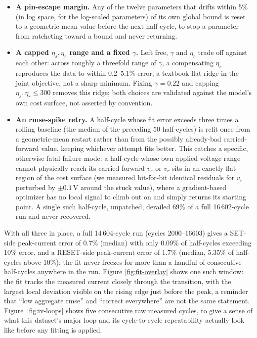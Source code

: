 \documentclass[11pt]{article}
\begin{document}
\begin{itemize}
\item \textbf{A pin-escape margin.} Any of the twelve parameters that drifts
  within 5\% (in log space, for the log-scaled parameters) of its own global
  bound is reset to a geometric-mean value before the next half-cycle, to
  stop a parameter from ratcheting toward a bound and never returning.
\item \textbf{A capped $\eta_s, \eta_r$ range and a fixed $\gamma$.} Left
  free, $\gamma$ and $\eta_r$ trade off against each other: across roughly a
  threefold range of $\gamma$, a compensating $\eta_r$ reproduces the data to
  within 0.2--5.1\% error, a textbook flat ridge in the joint objective, not
  a sharp minimum. Fixing $\gamma = 0.22$ and capping
  $\eta_s, \eta_r \le 300$ removes this ridge; both choices are validated
  against the model's own cost surface, not asserted by convention.
\item \textbf{An rmse-spike retry.} A half-cycle whose fit error exceeds
  three times a rolling baseline (the median of the preceding 50 half-cycles)
  is refit once from a geometric-mean restart rather than from the possibly
  already-bad carried-forward value, keeping whichever attempt fits better.
  This catches a specific, otherwise fatal failure mode: a half-cycle whose
  own applied voltage range cannot physically reach its carried-forward
  $v_s$ or $v_r$ sits in an exactly flat region of the cost surface (we
  measured bit-for-bit identical residuals for $v_r$ perturbed by
  $\pm0.1\,$V around the stuck value), where a gradient-based optimizer has
  no local signal to climb out on and simply returns its starting point. A
  single such half-cycle, unpatched, derailed 69\% of a full 16\,602-cycle
  run and never recovered.
\end{itemize}

With all three in place, a full 14\,604-cycle run (cycles 2000--16603) gives
a SET-side peak-current error of 0.7\% (median) with only 0.09\% of
half-cycles exceeding 10\% error, and a RESET-side peak-current error of
1.7\% (median, 5.35\% of half-cycles above 10\%); the fit never freezes for
more than a handful of consecutive half-cycles anywhere in the run. Figure
\ref{fig:fit-overlay} shows one such window: the fit tracks the measured
current closely through the transition, with the largest local deviation
visible on the rising edge just before the peak, a reminder that ``low
aggregate rmse'' and ``correct everywhere'' are not the same statement.
Figure~\ref{fig:iv-loops} shows five consecutive raw measured cycles, to
give a sense of what this dataset's major loop and its cycle-to-cycle
repeatability actually look like before any fitting is applied.
\end{document}
